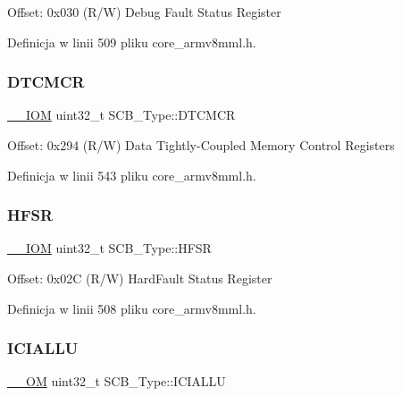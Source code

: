 Offset\+: 0x030 (R/W) Debug Fault Status Register 

Definicja w linii 509 pliku core\+\_\+armv8mml.\+h.

\mbox{\label{struct_s_c_b___type_a2836e932734240076ce91cf4484cdf43}} 
\subsubsection{\texorpdfstring{D\+T\+C\+M\+CR}{DTCMCR}}
{\footnotesize\ttfamily \hyperlink{core__sc300_8h_ab6caba5853a60a17e8e04499b52bf691}{\+\_\+\+\_\+\+I\+OM} uint32\+\_\+t S\+C\+B\+\_\+\+Type\+::\+D\+T\+C\+M\+CR}

Offset\+: 0x294 (R/W) Data Tightly-\/\+Coupled Memory Control Registers 

Definicja w linii 543 pliku core\+\_\+armv8mml.\+h.

\mbox{\label{struct_s_c_b___type_a14ad254659362b9752c69afe3fd80934}} 
\subsubsection{\texorpdfstring{H\+F\+SR}{HFSR}}
{\footnotesize\ttfamily \hyperlink{core__sc300_8h_ab6caba5853a60a17e8e04499b52bf691}{\+\_\+\+\_\+\+I\+OM} uint32\+\_\+t S\+C\+B\+\_\+\+Type\+::\+H\+F\+SR}

Offset\+: 0x02C (R/W) Hard\+Fault Status Register 

Definicja w linii 508 pliku core\+\_\+armv8mml.\+h.

\mbox{\label{struct_s_c_b___type_a573260e7836dbc43707df97dd475a0c8}} 
\subsubsection{\texorpdfstring{I\+C\+I\+A\+L\+LU}{ICIALLU}}
{\footnotesize\ttfamily \hyperlink{core__sc300_8h_a0ea2009ed8fd9ef35b48708280fdb758}{\+\_\+\+\_\+\+OM} uint32\+\_\+t S\+C\+B\+\_\+\+Type\+::\+I\+C\+I\+A\+L\+LU}


